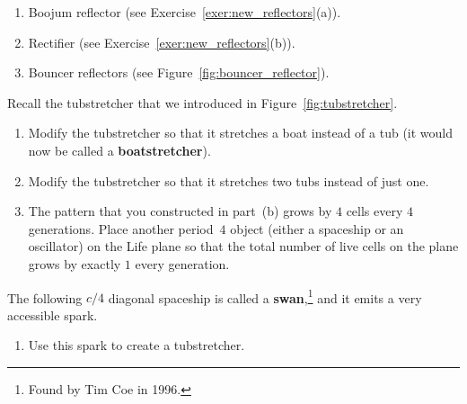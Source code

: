 \begin{multicols}{2}
\begin{problemstar}
\begin{enumerate}[label=\bf\color{ocre}(\alph*)]
			\item Boojum reflector (see Exercise~\ref{exer:new_reflectors}(a)).
			
			\item Rectifier (see Exercise~\ref{exer:new_reflectors}(b)).
			
			\item Bouncer reflectors (see Figure~\ref{fig:bouncer_reflector}).
		\end{enumerate}
	\end{problemstar}
	
	
	\mfilbreak
	
	
	\begin{problem}\label{exer:tubstretcher_modify}
		Recall the tubstretcher that we introduced in Figure~\ref{fig:tubstretcher}.\smallskip
		
		\begin{enumerate}[label=\bf\color{ocre}(\alph*)]
			\item {} Modify the tubstretcher so that it stretches a boat instead of a tub (it would now be called a \textbf{boatstretcher}).
			
			\item {} Modify the tubstretcher so that it stretches two tubs instead of just one.
			
			\item {} The pattern that you constructed in part~(b) grows by $4$ cells every $4$ generations. Place another period~$4$ object (either a spaceship or an oscillator) on the Life plane so that the total number of live cells on the plane grows by exactly $1$ every generation. %
		\end{enumerate}
	\end{problem}
	
	
	\mfilbreak
	
	
	\begin{problemstar}\label{exer:swan_tubstretcher} 
		The following $c/4$ diagonal spaceship is called a \textbf{swan},\footnote{Found by Tim Coe in 1996.} and it emits a very accessible spark.
		
		\begin{center}
		\end{center}
		
		\begin{enumerate}[label=\bf\color{ocre}(\alph*)]
			\item Use this spark to create a tubstretcher.
			

\end{enumerate}
\end{problemstar}
\end{multicols}
